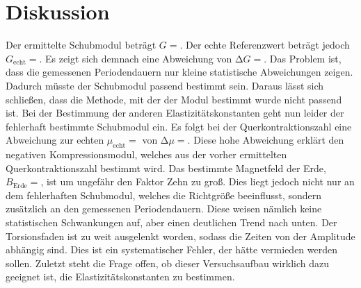 \section{Diskussion}
\label{sec:Diskussion}





Der ermittelte Schubmodul beträgt $G = $.
Der echte Referenzwert beträgt jedoch $G_{\text{echt}} = $.
Es zeigt sich demnach eine Abweichung von $\increment G = $.
Das Problem ist, dass die gemessenen Periodendauern nur kleine statistische Abweichungen zeigen.
Dadurch müsste der Schubmodul passend bestimmt sein.
Daraus lässt sich schließen, dass die Methode, mit der der Modul bestimmt wurde nicht passend ist.
Bei der Bestimmung der anderen Elastizitätskonstanten geht nun leider der fehlerhaft bestimmte Schubmodul ein.
Es folgt bei der Querkontraktionszahl eine Abweichung zur echten $\mu_{\text{echt}} = $ von $\increment \mu = $.
Diese hohe Abweichung erklärt den negativen Kompressionsmodul, welches aus der vorher ermittelten Querkontraktionszahl bestimmt wird.
Das bestimmte Magnetfeld der Erde, $B_{\text{Erde}}=$, ist um ungefähr den Faktor Zehn zu groß.
Dies liegt jedoch nicht nur an dem fehlerhaften Schubmodul, welches die Richtgröße beeinflusst, sondern zusätzlich an den gemessenen Periodendauern.
Diese weisen nämlich keine statistischen Schwankungen auf, aber einen deutlichen Trend nach unten.
Der Torsionsfaden ist zu weit ausgelenkt worden, sodass die Zeiten von der Amplitude abhängig sind.
Dies ist ein systematischer Fehler, der hätte vermieden werden sollen.
Zuletzt steht die Frage offen, ob dieser Versuchsaufbau wirklich dazu geeignet ist, die Elastizitätskonstanten zu bestimmen.
